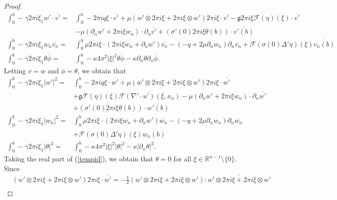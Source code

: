 \documentclass[11pt,letterpaper,reqno]{amsart}
\numberwithin{equation}{section}
\newcommand{\abs}[1]{\left\lvert#1\right\rvert}
\begin{document}
\begin{proof}
\begin{align}
        \int_{0}^{b}-\gamma 2\pi i \xi_{1}w' \cdot\overline{v'}=&\int_{0}^{b}-2\pi i q\xi \cdot \overline{v'}+\mu(w' \otimes 2\pi i\xi+2\pi i \xi \otimes w')2\pi i \xi\cdot\overline{v'}-\mathfrak{g}2\pi i \xi\mathcal{F}(\eta)(\xi)\cdot\overline{v'} \nonumber\\
        &-\mu(\partial_{n}w'+2\pi i \xi w_{n})\cdot\partial_{n}\overline{v'}+(\sigma'(0)2\pi i \xi\theta(b))\cdot\overline{v'(b)} \nonumber\\
        \int_{0}^{b}-\gamma2\pi i\xi_{1}w_{n}\overline{v_{n}}=&\int_{0}^{b}\mu 2\pi i \xi \cdot (2\pi i \xi w_{n}+\partial_{n}w')\overline{v_{n}}-(-q+2\mu\partial_{n}w_{n})\partial_{n}\overline{v_{n}}+\mathcal{F}(\sigma(0)\Delta'\eta)(\xi)\overline{v_{n}(b)} \nonumber\\
        \int_{0}^{b}-\gamma2\pi i \xi_{1}\theta\overline{\phi}=&\int_{0}^{b}-\kappa 4\pi^{2}\abs{\xi}^{2}\theta\overline{\phi}-\kappa\partial_{n}\theta\partial_{n}\overline{\phi}.
    \end{align}
    Letting \(v=w\) and \(\phi=\theta\), we obtain that
    \begin{align}
        \int_{0}^{b}-\gamma 2\pi i \xi_{1}\abs{w'}^{2} =& \int_{0}^{b}-2\pi i q \xi \cdot\overline{w'}+\mu(w' \otimes 2\pi i \xi + 2\pi i \xi \otimes w')2\pi i \xi \cdot\overline{w'} \nonumber\\
        &+\mathfrak{g}\mathcal{F}(\eta)(\xi)\overline{\mathcal{F}(\nabla' \cdot u')(\xi,x_{n})}-\mu(\partial_{n}w'+2\pi i \xi w_{n})\cdot\partial_{n}\overline{w'} \nonumber\\
        &+(\sigma'(0)2\pi i \xi\theta(b))\cdot\overline{w'(b)} \nonumber\\
        \int_{0}^{b}-\gamma 2\pi i \xi_{1}\abs{w_{n}}^{2}=&\int_{0}^{b}\mu 2\pi i \xi \cdot (2\pi i \xi w_{n}+\partial_{n}w')\overline{w_{n}}-(-q+2\mu\partial_{n}w_{n})\partial_{n}\overline{w_{n}} \nonumber\\
        &+\mathcal{F}(\sigma(0)\Delta'\eta)(\xi)\overline{w_{n}(b)} \nonumber\\
        \int_{0}^{b}-\gamma 2\pi i \xi_{1}\abs{\theta}^{2}=&\int_{0}^{b}-\kappa 4\pi^{2}\abs{\xi}^{2}\abs{\theta}^{2}-\kappa\abs{\partial_{n}\theta}^{2}. \label{tempid}
    \end{align}
    Taking the real part of (\ref{tempid}), we obtain that \(\theta=0\) for all \(\xi \in \mathbb{R}^{n-1} \setminus \{0\}\). Since
    \begin{align}
        &(w' \otimes 2\pi i \xi +2\pi i \xi \otimes w')2\pi i \xi\cdot\overline{w'}=-\frac{1}{2}(w' \otimes 2\pi i \xi + 2\pi i \xi \otimes w'):\overline{w' \otimes 2\pi i \xi + 2\pi i \xi \otimes w'} \nonumber \\

\end{align}
\end{proof}
\end{document}

